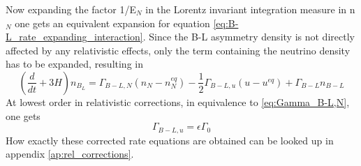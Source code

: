 Now expanding the factor 1/E$_N$ in the Lorentz invariant integration measure in n$_N$ one gets an equivalent expansion for equation \ref{eq:B-L_rate_expanding_interaction}. Since the B-L asymmetry density is not directly affected by any relativistic effects, only the term containing the neutrino density has to be expanded, resulting in
\begin{equation}
	\left(\frac{d}{dt}+3H\right)n_{B_L}=\Gamma_{B-L,N}\left(n_N-n_N^{eq}\right)-\frac{1}{2}\Gamma_{B-L,u}\left(u-u^{eq}\right)+\Gamma_{B-L}n_{B-L}
	\label{eq:B-L_rate_expanding_interaction_rel}
\end{equation}
At lowest order in relativistic corrections, in equivalence to \ref{eq:Gamma_B-L,N}, one gets
\begin{equation}
	\Gamma_{B-L,u}=\epsilon\Gamma_0
	\label{eq:Gamma_B-L,u}
\end{equation}
How exactly these corrected rate equations are obtained can be looked up in appendix \ref{ap:rel_corrections}.
